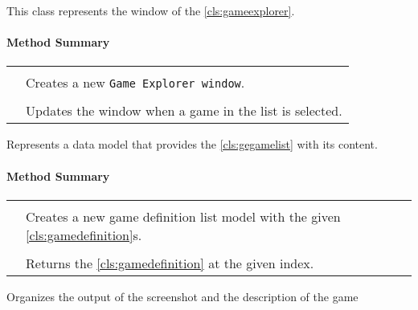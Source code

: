 This class represents the window of the \ref{cls:gameexplorer}. \\

\centerdash

\paragraph*{Method Summary}
\paragraph*{}
\begin{longtable}{Lp{10cm}}
	\startmethodtable
	 \\
	& Creates a new \texttt{Game Explorer window}. \\
	 \\
	& Updates the window when a game in the list is selected. \\
	\hline
\end{longtable}

Represents a data model that provides the \ref{cls:gegamelist} with its content. \\

\centerdash

\paragraph*{Method Summary}
\paragraph*{}
\begin{longtable}{Lp{10cm}}
	\startmethodtable
	 \\
	& Creates a new game definition list model with the given \ref{cls:gamedefinition}s. \\
	 \\
	& Returns the \ref{cls:gamedefinition} at the given index. \\
	\hline
\end{longtable}

Organizes the output of the screenshot and the description of the game \\

